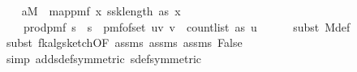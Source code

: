 \begin{isabellebody}
\isanewline
\ \ \isamarkupfalse%
\ a{\isacharcolon}{\kern0pt}{\isachardoublequoteopen}M\ {\isacharequal}{\kern0pt}\ map{\isacharunderscore}{\kern0pt}pmf\ {\isacharparenleft}{\kern0pt}{\isasymlambda}x{\isachardot}{\kern0pt}\ {\isacharparenleft}{\kern0pt}ssk{\isacharcomma}{\kern0pt}length\ as{\isacharcomma}{\kern0pt}\ x{\isacharparenright}{\kern0pt}{\isacharparenright}{\kern0pt}\isanewline
\ \ \ \ {\isacharparenleft}{\kern0pt}prod{\isacharunderscore}{\kern0pt}pmf\ {\isacharparenleft}{\kern0pt}{\isacharbraceleft}{\kern0pt}{}{\isachardot}{\kern0pt}{\isachardot}{\kern0pt}{\isacharless}{\kern0pt}s\ {\isasymtimes}\ {\isacharbraceleft}{\kern0pt}{}{\isachardot}{\kern0pt}{\isachardot}{\kern0pt}{\isacharless}{\kern0pt}s\ {\isacharparenleft}{\kern0pt}{\isasymlambda}{\isacharunderscore}{\kern0pt}{\isachardot}{\kern0pt}\ pmf{\isacharunderscore}{\kern0pt}of{\isacharunderscore}{\kern0pt}set\ {\isacharbraceleft}{\kern0pt}{\isacharparenleft}{\kern0pt}u{\isacharcomma}{\kern0pt}v{\isacharparenright}{\kern0pt}{\isachardot}{\kern0pt}\ v\ {\isacharless}{\kern0pt}\ count{\isacharunderscore}{\kern0pt}list\ as\ u{\isacharbraceright}{\kern0pt}{\isacharparenright}{\kern0pt}{\isacharparenright}{\kern0pt}{\isachardoublequoteclose}\isanewline
\ \ \ \ \isamarkupfalse%
\ {\isacharparenleft}{\kern0pt}subst\ M{\isacharunderscore}{\kern0pt}def{\isacharparenright}{\kern0pt}\isanewline
\ \ \ \ \isamarkupfalse%
\ {\isacharparenleft}{\kern0pt}subst\ fk{\isacharunderscore}{\kern0pt}alg{\isacharunderscore}{\kern0pt}sketch{\isacharbrackleft}{\kern0pt}OF\ assms{\isacharparenleft}{\kern0pt}{}{\isacharparenright}{\kern0pt}\ assms{\isacharparenleft}{\kern0pt}{}{\isacharparenright}{\kern0pt}\ assms{\isacharparenleft}{\kern0pt}{}{\isacharparenright}{\kern0pt}\ False{\isacharbrackright}{\kern0pt}{\isacharparenright}{\kern0pt}\isanewline
\ \ \ \ \isamarkupfalse%
\ {\isacharparenleft}{\kern0pt}simp\ add{\isacharcolon}{\kern0pt}sdef{\isacharbrackleft}{\kern0pt}symmetric{\isacharbrackright}{\kern0pt}\ sdef{\isacharbrackleft}{\kern0pt}symmetric{\isacharbrackright}{\kern0pt}{\isacharparenright}{\kern0pt}\isanewline
\isanewline
\ \ \isamarkupfalse%

\end{isabellebody}
